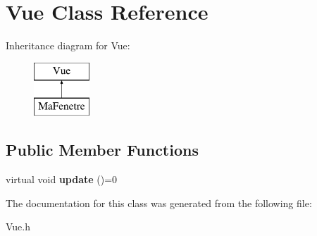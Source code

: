 \section{Vue Class Reference}
\label{class_vue}
Inheritance diagram for Vue\-:\begin{figure}[H]
\begin{center}
\leavevmode
\includegraphics[height=2.000000cm]{class_vue}
\end{center}
\end{figure}
\subsection*{Public Member Functions}
\begin{DoxyCompactItemize}
\item 
virtual void {\bfseries update} ()=0\label{class_vue_a49c501f530bbe66414c415c438ec0695}

\end{DoxyCompactItemize}


The documentation for this class was generated from the following file\-:\begin{DoxyCompactItemize}
\item 
Vue.\-h\end{DoxyCompactItemize}
